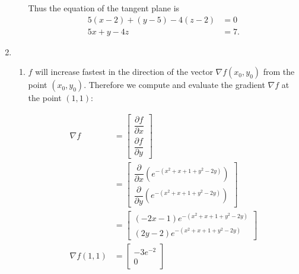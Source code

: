 \documentclass{article}
\begin{document}
\begin{enumerate}
\begin{enumerate}
   Thus the equation of the tangent plane is
   \begin{align*}
    5(x - 2) + (y - 5) - 4(z - 2) &= 0 \\
    5x + y - 4z &= 7.
   \end{align*}
 \end{enumerate}

\item

 \begin{enumerate}
  \item $f$ will increase fastest in the direction of the vector
   $\nabla f(x_0,y_0)$ from the point $(x_0, y_0)$.  Therefore we compute and
   evaluate the gradient $\nabla f$ at the point $(1, 1)$:

   \begin{align*}
    \nabla f &= \begin{bmatrix}
                 \dfrac{\partial f}{\partial x} \\
                 \dfrac{\partial f}{\partial y}
                \end{bmatrix} \\
             &= \begin{bmatrix}
                 \dfrac{\partial}{\partial x}(e^{-(x^2+x+1+y^2-2y)}) \\
                 \dfrac{\partial}{\partial y}(e^{-(x^2+x+1+y^2-2y)})
                \end{bmatrix} \tag{1} \label{fastest_incr:grad}  \\
             &= \begin{bmatrix}
                 (-2x - 1)e^{-(x^2+x+1+y^2-2y)} \\
                 (2y - 2)e^{-(x^2+x+1+y^2-2y)}
                \end{bmatrix} \\
    \nabla f(1, 1) &= \begin{bmatrix} -3e^{-2} \\ 0 \end{bmatrix}
   \end{align*}


\end{enumerate}
\end{enumerate}
\end{document}
